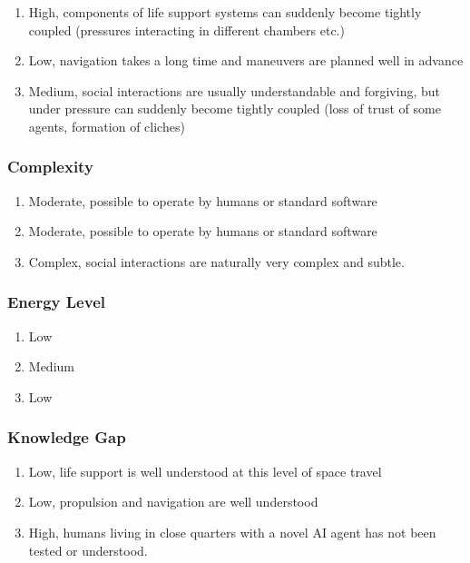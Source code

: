 \documentclass[11pt]{article}
\begin{document}
\begin{enumerate}
\item High, components of life support systems can suddenly become tightly coupled (pressures
interacting in different chambers etc.)
\item Low, navigation takes a long time and maneuvers are planned well in advance
\item Medium, social interactions are usually understandable and forgiving, but under pressure can
suddenly become tightly coupled (loss of trust of some agents, formation of cliches)
\end{enumerate}

\subsubsection*{Complexity}

\begin{enumerate}
\item Moderate, possible to operate by humans or standard software
\item Moderate, possible to operate by humans or standard software
\item Complex, social interactions are naturally very complex and subtle.
\end{enumerate}

\subsubsection*{Energy Level}

\begin{enumerate}
\item Low
\item Medium
\item Low
\end{enumerate}

\subsubsection*{Knowledge Gap}

\begin{enumerate}
\item Low, life support is well understood at this level of space travel
\item Low, propulsion and navigation are well understood
\item High, humans living in close quarters with a novel AI agent has not been tested or understood.
\end{enumerate}
\end{document}

